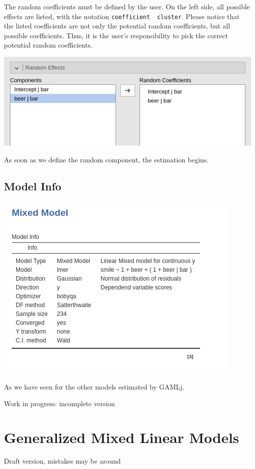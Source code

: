 \documentclass[
]{book}
\begin{document}
The random coefficients must be defined by the user. On the left side, all possible effects are listed, with the notation \texttt{coefficient\ \textbar{}\ cluster}. Please notice that the listed coefficients are not only the potential random coefficients, but all possible coefficients. Thus, it is the user's responsibility to pick the correct potential random coefficients.

\includegraphics[width=0.7\linewidth]{bookletpics/4_simple_input3}

As soon as we define the random component, the estimation begins.

\hypertarget{model-info}{%
\section{Model Info}\label{model-info}}

\includegraphics[width=0.7\linewidth]{bookletpics/4_simple_output1}

As we have seen for the other models estimated by {GAMLj}.

{ Work in progress: incomplete version }

\hypertarget{gmixed}{%
\chapter{Generalized Mixed Linear Models}\label{gmixed}}

{ Draft version, mistakes may be around }
\end{document}
